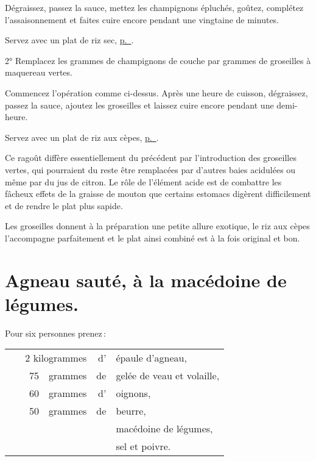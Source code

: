 Dégraissez, passez la sauce, mettez les champignons épluchés, goûtez, complétez
l'assaisonnement et faites cuire encore pendant une vingtaine de minutes.

Servez avec un plat de riz sec, \hyperlink{p0707}{p. \pageref{pg0707}}.

\medskip

2° Remplacez les {\mmm} grammes de champignons de couche par
{\mmm} grammes de groseilles à maquereau vertes.

Commencez l'opération comme ci-dessus. Après une heure de cuisson, dégraissez,
passez la sauce, ajoutez les groseilles et laissez cuire encore pendant une
demi-heure.

Servez avec un plat de riz aux cèpes, \hyperlink{p0708-1}{p. \pageref{pg0708-1}}.

Ce ragoût diffère essentiellement du précédent par l'introduction des
groseilles vertes, qui pourraient du reste être remplacées par d'autres baies
acidulées ou même par du jus de citron. Le rôle de l'élément acide est de
combattre les fâcheux effets de la graisse de mouton que certains estomacs
digèrent difficilement et de rendre le plat plus sapide.

Les groseilles donnent à la préparation une petite allure exotique, le riz aux
cèpes l'accompagne parfaitement et le plat ainsi combiné est à la fois original
et bon.

\section*{\centering Agneau sauté, à la macédoine de légumes.}
{}

Pour six personnes prenez :

\medskip

\footnotesize
\begin{longtable}{rp{2em}rrrp{16em}}
& \multicolumn{3}{r}{2 kilogrammes} & d' & épaule d'agneau,                                               \\
& &    75 & grammes & de & gelée de veau et volaille,                                                     \\
& &    60 & grammes & d' & oignons,                                                                       \\
& &    50 & grammes & de & beurre,                                                                        \\
& &       &         &    & macédoine de légumes,                                                          \\
& &       &         &    & sel et poivre.                                                                 \\
\end{longtable}
\normalsize

